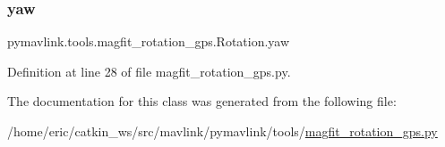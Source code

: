 \subsubsection{\texorpdfstring{yaw}{yaw}}
{\footnotesize\ttfamily pymavlink.\+tools.\+magfit\+\_\+rotation\+\_\+gps.\+Rotation.\+yaw}



Definition at line 28 of file magfit\+\_\+rotation\+\_\+gps.\+py.



The documentation for this class was generated from the following file\+:\begin{DoxyCompactItemize}
\item 
/home/eric/catkin\+\_\+ws/src/mavlink/pymavlink/tools/\mbox{\hyperlink{magfit__rotation__gps_8py}{magfit\+\_\+rotation\+\_\+gps.\+py}}\end{DoxyCompactItemize}

